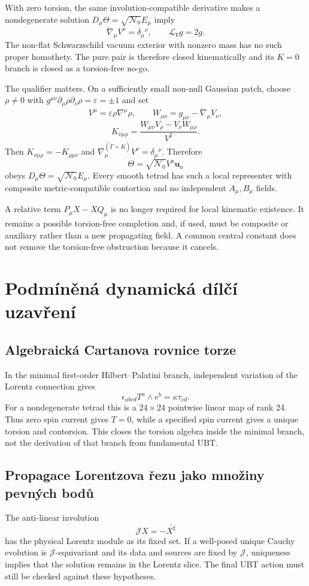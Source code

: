 With zero torsion, the same involution-compatible derivative makes a
nondegenerate solution $D_\mu\Theta=\sqrt{\mathcal N_0}E_\mu$ imply
\[
 \boxed{\mathring\nabla_\mu V^\nu=\delta_\mu{}^\nu,}
 \qquad \mathcal L_Vg=2g.
\]
The non-flat Schwarzschild vacuum exterior with nonzero mass has no such proper
homothety.  The pure pair is therefore closed kinematically and its $K=0$
branch is closed as a torsion-free no-go.

The qualifier matters.  On a sufficiently small non-null Gaussian patch,
choose $\rho\ne0$ with
$g^{\mu\nu}\partial_\mu\rho\partial_\nu\rho=\varepsilon=\pm1$ and set
\[
 V^\mu=\varepsilon\rho\nabla^\mu\rho,
 \qquad
 W_{\mu\nu}=g_{\mu\nu}-\mathring\nabla_\mu V_\nu,
\]
\[
 \boxed{K_{\nu\mu\rho}
 =\frac{W_{\mu\nu}V_\rho-V_\nu W_{\mu\rho}}{V^2}.}
\]
Then $K_{\nu\mu\rho}=-K_{\rho\mu\nu}$ and
$\nabla^{(\mathring\Gamma+K)}_\mu V^\nu=\delta_\mu{}^\nu$.  Therefore
\[
 \Theta=\sqrt{\mathcal N_0}V^a\mathbf u_a
\]
obeys $D_\mu\Theta=\sqrt{\mathcal N_0}E_\mu$.  Every smooth tetrad has such a
local representer with composite metric-compatible contortion and no
independent $A_\mu,B_\mu$ fields.

A relative term $P_\mu X-XQ_\mu$ is no longer required for local kinematic
existence.  It remains a possible torsion-free completion and, if used, must be
composite or auxiliary rather than a new propagating field.  A common central
constant does not remove the torsion-free obstruction because it cancels.

\section{Podmíněná dynamická dílčí uzavření}
\subsection{Algebraická Cartanova rovnice torze}
In the minimal first-order Hilbert--Palatini branch, independent variation of
the Lorentz connection gives
\[
 \epsilon_{abcd}T^a\wedge e^b=\kappa\tau_{cd}.
\]
For a nondegenerate tetrad this is a $24\times24$ pointwise linear map of rank
24. Thus zero spin current gives $T=0$, while a specified spin current gives a
unique torsion and contorsion. This closes the torsion algebra inside the
minimal branch, not the derivation of that branch from fundamental UBT.

\subsection{Propagace Lorentzova řezu jako množiny pevných bodů}
The anti-linear involution
\[
 \mathcal JX=-\overline{X^\sharp}
\]
has the physical Lorentz module as its fixed set. If a well-posed unique
Cauchy evolution is $\mathcal J$-equivariant and its data and sources are fixed
by $\mathcal J$, uniqueness implies that the solution remains in the Lorentz
slice. The final UBT action must still be checked against these hypotheses.

